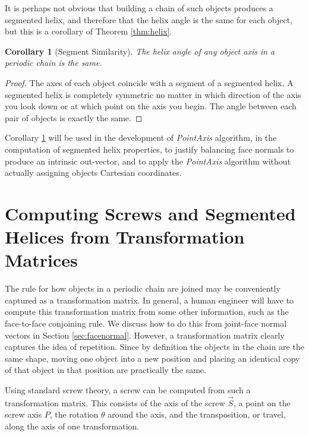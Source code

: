 \documentclass[11pt]{article}
\newtheorem{corollary}{Corollary}
\begin{document}
{It is perhaps not obvious that building a chain of such objects
produces a segmented helix, and therefore that the helix angle is the
same for each object, but this is a corollary of Theorem \ref{thm:helix}.


\begin{corollary}[Segment Similarity]
  The helix angle of any object axis in a periodic chain is the same.
  \label{cor:symmetric}
\end{corollary}

\begin{proof}
  The axes of each object coincide with a segment of a segmented helix.
  A segmented helix is completely symmetric no matter in which direction
  of the axis you look down or at which point on the axis you begin. The angle between each pair of objects
  is exactly the same.
\end{proof}

Corollary \ref{cor:symmetric} will be used in the development of {\em PointAxis} algorithm,
in the computation of segmented helix properties, to justify balancing face normals
to produce an intrinsic out-vector, and to apply the {\em PointAxis} algorithm
without actually assigning objects Cartesian coordinates.

\section{Computing Screws and Segmented Helices from Transformation Matrices}
\label{sec:screws}

The rule for how objects in a periodic chain are joined may be
conveniently captured as a transformation
matrix.
In general, a human engineer will have to compute this transformation matrix from some other
information, such as the face-to-face conjoining rule.
We discuss how to do this from joint-face normal
vectors in Section \ref{sec:facenormal}. However, a transformation matrix clearly
captures the idea of repetition.
Since by definition the objects in the chain are the same shape,
moving one object into a new position and placing an identical copy of that object in that position
are practically the same.

Using standard screw theory\cite{wittenburg2016kinematics,wiki:screwaxis},
a screw can be computed from such
a transformation matrix. This consists of the axis of the screw $\overrightarrow{S}$,
a point on the screw axis $P$,
the rotation $\theta$ around the axis, and the
transposition, or travel, along the axis of one transformation.

}
\end{document}
